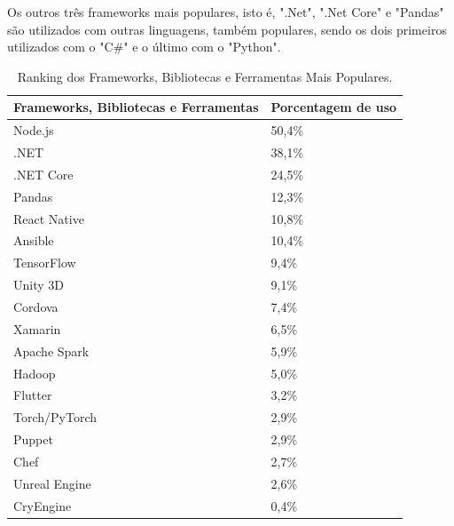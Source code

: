 Os outros três frameworks mais populares, isto é, ".Net", ".Net Core" e "Pandas" são utilizados com outras linguagens, também populares, sendo os dois primeiros utilizados com o "C\#" e o último com o "Python".

\begin{table}[htb]
\ABNTEXfontereduzida
\caption[Ranking dos Frameworks, Bibliotecas e Ferramentas Mais Populares]{Ranking dos Frameworks, Bibliotecas e Ferramentas Mais Populares.}
\label{tab-stack-overflow-framework-tools}
\begin{tabular}{p{5cm}|p{4cm}}
   \textbf{Frameworks, Bibliotecas e Ferramentas} & \textbf{Porcentagem de uso}  \\
    \hline
    Node.js & 50,4\%  \\
    \hline
    .NET & 38,1\%  \\
    \hline
    .NET Core & 24,5\%  \\
    \hline
    Pandas & 12,3\%  \\
    \hline
    React Native & 10,8\%  \\
    \hline
    Ansible & 10,4\%  \\
    \hline
    TensorFlow & 9,4\%  \\
    \hline
    Unity 3D & 9,1\%  \\
    \hline
    Cordova & 7,4\%  \\
    \hline
    Xamarin & 6,5\%  \\
    \hline
    Apache Spark & 5,9\%  \\
    \hline
    Hadoop & 5,0\%  \\
    \hline
    Flutter & 3,2\%  \\
    \hline
    Torch/PyTorch & 2,9\%  \\
    \hline
    Puppet & 2,9\%  \\
    \hline
    Chef & 2,7\%  \\
    \hline
    Unreal Engine & 2,6\%  \\
    \hline
    CryEngine & 0,4\%  \\
    
\end{tabular}
\end{table}

